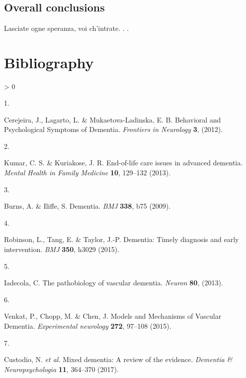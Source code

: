 \documentclass[a4paper, twoside]{templates/ociamthesis}
\newlength{\cslhangindent}
\newlength{\csllabelwidth}
\newenvironment{CSLReferences}[3] %
 {%
  \setlength{\parindent}{0pt}
  \ifodd #1 \everypar{\setlength{\hangindent}{\cslhangindent}}\ignorespaces\fi
  \ifnum #2 > 0
  \setlength{\parskip}{#2\baselineskip}
  \fi
 }%
 {}
\newcommand{\CSLLeftMargin}[1]{\parbox[t]{\maxof{\widthof{#1}}{\csllabelwidth}}{#1}}
\newcommand{\CSLRightInline}[1]{\parbox[t]{\linewidth - \csllabelwidth}{#1}}
\begin{document}
~

\hypertarget{overall-conclusions}{%
\section{Overall conclusions}\label{overall-conclusions}}

\begin{savequote}
Lasciate ogne speranza, voi ch'intrate. . .
\end{savequote}

\hypertarget{bibliography}{%
\chapter{Bibliography}\label{bibliography}}

\hypertarget{refs}{}
\begin{CSLReferences}{0}{0}
\leavevmode\hypertarget{ref-cerejeira2012}{}%
\CSLLeftMargin{1. }
\CSLRightInline{Cerejeira, J., Lagarto, L. \& Mukaetova-Ladinska, E. B. Behavioral and {Psychological Symptoms} of {Dementia}. \emph{Frontiers in Neurology} \textbf{3}, (2012).}

\leavevmode\hypertarget{ref-kumar2013}{}%
\CSLLeftMargin{2. }
\CSLRightInline{Kumar, C. S. \& Kuriakose, J. R. End-of-life care issues in advanced dementia. \emph{Mental Health in Family Medicine} \textbf{10}, 129--132 (2013).}

\leavevmode\hypertarget{ref-burns2009}{}%
\CSLLeftMargin{3. }
\CSLRightInline{Burns, A. \& Iliffe, S. Dementia. \emph{BMJ} \textbf{338}, b75 (2009).}

\leavevmode\hypertarget{ref-robinson2015}{}%
\CSLLeftMargin{4. }
\CSLRightInline{Robinson, L., Tang, E. \& Taylor, J.-P. Dementia: Timely diagnosis and early intervention. \emph{BMJ} \textbf{350}, h3029 (2015).}

\leavevmode\hypertarget{ref-iadecola2013}{}%
\CSLLeftMargin{5. }
\CSLRightInline{Iadecola, C. The pathobiology of vascular dementia. \emph{Neuron} \textbf{80}, (2013).}

\leavevmode\hypertarget{ref-venkat2015}{}%
\CSLLeftMargin{6. }
\CSLRightInline{Venkat, P., Chopp, M. \& Chen, J. Models and {Mechanisms} of {Vascular Dementia}. \emph{Experimental neurology} \textbf{272}, 97--108 (2015).}

\leavevmode\hypertarget{ref-custodio2017}{}%
\CSLLeftMargin{7. }
\CSLRightInline{Custodio, N. \emph{et al.} Mixed dementia: {A} review of the evidence. \emph{Dementia \& Neuropsychologia} \textbf{11}, 364--370 (2017).}


\end{CSLReferences}
\end{document}
